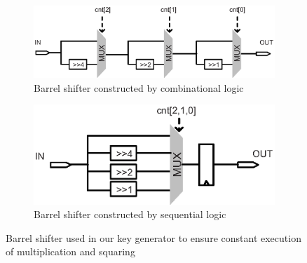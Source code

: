 \documentclass[preprint]{iacrtrans}
\begin{document}
\begin{figure}[!tb]
\centering
\begin{subfigure}[t]{0.5\textwidth}\centering
\includegraphics[width=\textwidth]{./fig/barrel1.eps}
\caption{Barrel shifter constructed by combinational logic}
\label{fig:L1_ctrl}
\end{subfigure}
\hspace{1em}
\begin{subfigure}[t]{0.4\textwidth}\centering
\includegraphics[width=\textwidth]{./fig/barrel2.eps}
\caption{Barrel shifter constructed by sequential logic}
\label{fig:FLIP_ctrl}
\end{subfigure}
\caption{Barrel shifter used in our key generator to ensure constant execution of multiplication and squaring}
\end{figure}
\end{document}
